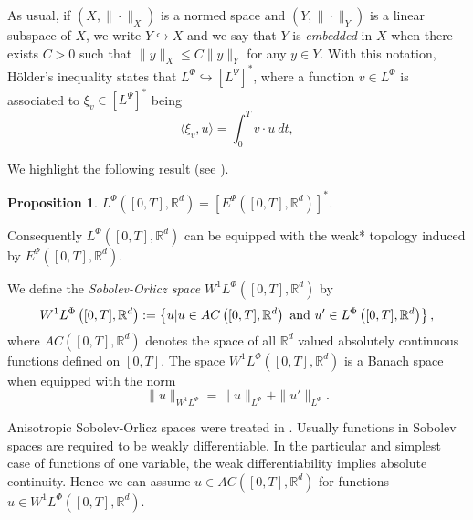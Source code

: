 \documentclass[twoside]{article}
\newtheorem{prop}[thm]{Proposition}
\theoremstyle{remark}
\newcommand{\orlnor}{\|_{L^{\Phi}}}
\newcommand{\lphi}{L^{\Phi}}
\newcommand{\lpsi}{L^{\Psi}}
\newcommand{\ephi}{E^{\Phi}}
\newcommand{\wphi}{W^{1}\lphi}
\newcommand{\wphie}{W^{1}\ephi}
\newcommand{\rr}{\mathbb{R}}
\renewcommand{\leq}{\leqslant}
\newcommand{\epsi}{E^{\Psi}}
\begin{document}
As usual, if $(X,\|\cdot\|_X)$ is a normed space and $(Y,\|\cdot \|_Y)$ is a linear subspace of $X$,  we write $Y\hookrightarrow X$ and we say that $Y$ is \emph{embedded} in $X$  when there exists $C>0$ such that
$\|y\|_X\leq C\|y\|_Y$ for any $y\in Y$.  With this notation, H\"older's inequality states that  $\lphi\hookrightarrow  \left[\lpsi\right]^*$, where a function $v\in\lphi$ is associated  to $\xi_v\in \left[\lpsi\right]^*$ being
\begin{equation}\label{pairing}
  \langle \xi_v,u\rangle=\int_0^Tv\cdot u\ dt,
\end{equation}

We highlight the following result (see \cite[Th. 3.3]{gwiazda2013anisotropic}).

\begin{prop} $\lphi\left([0,T],\rr^d\right)=\left[\epsi\left([0,T],\rr^d\right)\right]^*$.
 
\end{prop}

Consequently  $\lphi\left([0,T],\rr^d\right)$ can be equipped with the weak* topology induced by $\epsi\left([0,T],\rr^d\right)$.






We define the \emph{Sobolev-Orlicz space} $\wphi\left([0,T],\rr^d\right)$ by
\[\wphi\left([0,T],\rr^d\right):=\left\{u| u\in AC\left([0,T],\rr^d\right) \hbox{ and } u'\in \lphi\left([0,T],\rr^d\right)\right\},\]
where $AC\left([0,T],\rr^d\right)$ denotes the space of all $\rr^d$ valued absolutely continuous functions defined on $[0,T]$. The space $\wphi\left([0,T],\rr^d\right)$ is a Banach space when equipped with the norm
\begin{equation}\label{def-norma-orlicz-sob}
\|  u  \|_{\wphi}= \|  u  \|_{\lphi} + \|u'\orlnor.
\end{equation}

Anisotropic Sobolev-Orlicz spaces were treated in \cite{cianchi2000fully,cianchi2004optimal,chamra2017anisotropic,trudinger1974imbedding}. Usually functions in Sobolev spaces are required to be weakly differentiable. In the particular and simplest case of functions of one variable, the weak differentiability implies absolute continuity. Hence we can assume $u\in AC\left([0,T],\rr^d\right)$ for functions $u\in\wphi\left([0,T],\rr^d\right)$.
% 
% 
\end{document}
